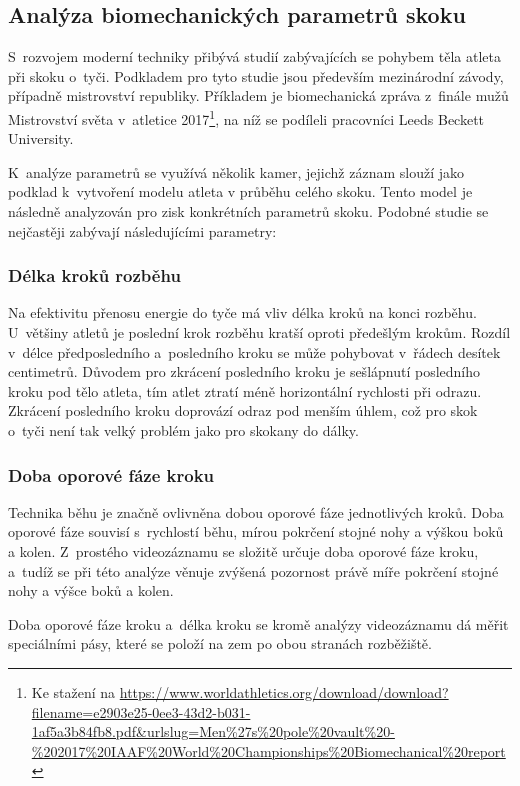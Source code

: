 \subsection{Analýza biomechanických parametrů skoku}

S~rozvojem moderní techniky přibývá studií zabývajících se pohybem těla atleta při skoku o~tyči. Podkladem pro tyto studie jsou především mezinárodní závody, případně mistrovství republiky. Příkladem je biomechanická zpráva z~finále mužů Mistrovství světa v~atletice 2017\footnote{Ke stažení na \url{https://www.worldathletics.org/download/download?filename=e2903e25-0ee3-43d2-b031-1af5a3b84fb8.pdf&urlslug=Men\%27s\%20pole\%20vault\%20-\%202017\%20IAAF\%20World\%20Championships\%20Biomechanical\%20report}}, na níž se podíleli pracovníci Leeds Beckett University.

K~analýze parametrů se využívá několik kamer, jejichž záznam slouží jako podklad k~vytvoření modelu atleta v průběhu celého skoku. Tento model je následně analyzován pro zisk konkrétních parametrů skoku. Podobné studie se nejčastěji zabývají následujícími parametry:

\subsubsection{Délka kroků rozběhu}

Na efektivitu přenosu energie do tyče má vliv délka kroků na konci rozběhu. U~většiny atletů je poslední krok rozběhu kratší oproti předešlým krokům. Rozdíl v~délce předposledního a~posledního kroku se může pohybovat v~řádech desítek centimetrů. Důvodem pro zkrácení posledního kroku je sešlápnutí posledního kroku pod tělo atleta, tím atlet ztratí méně horizontální rychlosti při odrazu. Zkrácení posledního kroku doprovází odraz pod menším úhlem, což pro skok o~tyči není tak velký problém jako pro skokany do dálky.

\subsubsection{Doba oporové fáze kroku}

Technika běhu je značně ovlivněna dobou oporové fáze jednotlivých kroků. Doba oporové fáze souvisí s~rychlostí běhu, mírou pokrčení stojné nohy a výškou boků a kolen. Z~prostého videozáznamu se složitě určuje doba oporové fáze kroku, a~tudíž se při této analýze věnuje zvýšená pozornost právě míře pokrčení stojné nohy a výšce boků a kolen.

Doba oporové fáze kroku a~délka kroku se kromě analýzy videozáznamu dá měřit speciálními pásy, které se položí na zem po obou stranách rozběžiště.

